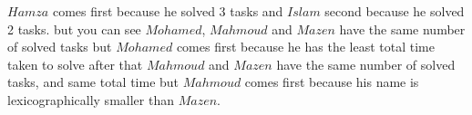$Hamza$ comes first because he solved 3 tasks and $Islam$ second because he solved 2 tasks. but you can see $Mohamed$, $Mahmoud$ and $Mazen$ have the same number of solved tasks but $Mohamed$ comes first because he has the least total time taken to solve after that $Mahmoud$ and $Mazen$ have the same number of solved tasks, and same total time but $Mahmoud$ comes first because his name is lexicographically smaller than $Mazen$. 

